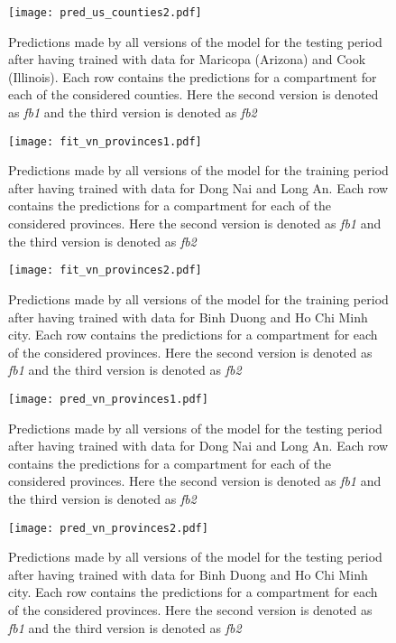 \begin{figure}[!htb]
    \centering
    \texttt{[image: pred\_us\_counties2.pdf]}
    \caption{Predictions made by all versions of the model for the testing period after having trained with data for Maricopa (Arizona) and Cook (Illinois). Each row contains the predictions for a compartment for each of the considered counties. Here the second version is denoted as \textit{fb1} and the third version is denoted as \textit{fb2}}
    \label{fig:pred-us-counties2}
\end{figure}

\begin{figure}[!htb]
    \centering
    \texttt{[image: fit\_vn\_provinces1.pdf]}
    \caption{Predictions made by all versions of the model for the training period after having trained with data for Dong Nai and Long An. Each row contains the predictions for a compartment for each of the considered provinces. Here the second version is denoted as \textit{fb1} and the third version is denoted as \textit{fb2}}
    \label{fig:fit-vn-provinces1}
\end{figure}

\begin{figure}[!htb]
    \centering
    \texttt{[image: fit\_vn\_provinces2.pdf]}
    \caption{Predictions made by all versions of the model for the training period after having trained with data for Binh Duong and Ho Chi Minh city. Each row contains the predictions for a compartment for each of the considered provinces. Here the second version is denoted as \textit{fb1} and the third version is denoted as \textit{fb2}}
    \label{fig:fit-vn-provinces2}
\end{figure}

\begin{figure}[!htb]
    \centering
    \texttt{[image: pred\_vn\_provinces1.pdf]}
    \caption{Predictions made by all versions of the model for the testing period after having trained with data for Dong Nai and Long An. Each row contains the predictions for a compartment for each of the considered provinces. Here the second version is denoted as \textit{fb1} and the third version is denoted as \textit{fb2}}
    \label{fig:pred-vn-provinces1}
\end{figure}


\begin{figure}[!htb]
    \centering
    \texttt{[image: pred\_vn\_provinces2.pdf]}
    \caption{Predictions made by all versions of the model for the testing period after having trained with data for Binh Duong and Ho Chi Minh city. Each row contains the predictions for a compartment for each of the considered provinces. Here the second version is denoted as \textit{fb1} and the third version is denoted as \textit{fb2}}
    \label{fig:pred-vn-provinces2}
\end{figure}

